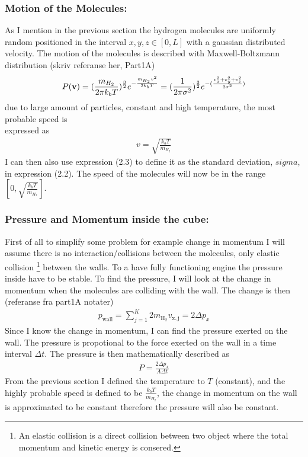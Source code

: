 \documentclass[a4paper,11pt,english]{report}
\begin{document}
\subsubsection{Motion of the Molecules:} As I mention in the previous section
the hydrogen molecules are uniformly random positioned in the interval
\(x,y,z \in [0,L]\) with a gaussian distributed velocity. The motion of the 
molecules is described with Maxwell-Boltzmann distribution (skriv referanse
her, Part1A)
\begin{align}
  P(\bold{v}) = (\frac{m_{H_{2}}}{2\pi
  k_{b}T})^{\frac{3}{2}}e^{-\frac{m_{H_{2}}v^{2}}{2k_{b}T}} =( \frac{1}{2\pi
  \sigma^{2}})^{\frac{3}{2}}e^{-(\frac{v_{x}^{2} + v_{y}^{2} + v_{z}^{2}}{2\sigma^{2}})}
\end{align}
due to large amount of particles, constant and high temperature, the most probable speed
is \\expressed as
\begin{align}
  v = \sqrt{\frac{k_{b}T}{m_{H_{2}}}}
\end{align}
I can then also use expression (2.3) to define it as the standard deviation,
\(sigma\), in expression (2.2). The speed of the molecules will now be in the
range \([0, \sqrt{\frac{k_{b}T}{m_{H_{2}}}} ]\).
\subsubsection{Pressure and Momentum inside the cube:} First of all to simplify some
problem for example change in momentum I will assume there is no
interaction/collisions between the molecules, only elastic collision
\footnote{An elastic collision is a direct collision between two object where
  the total momentum and kinetic energy is consered.} between the walls. To a
have fully functioning engine the pressure inside have to be stable. To find
the pressure, I will look at the
change in 
momentum when the molecules are colliding with the wall. The change is then (referanse fra part1A notater)
\begin{align}
 p_{\mathrm{wall}} =  \sum_{j = 1}^{K}2m_{\mathrm{H_{2}}}v_{\mathrm{x,j}} =
  2\Delta p_{x}
\end{align}
Since I know the change in momentum, I can find the pressure exerted on the
wall. The pressure is propotional to the force exerted on the wall in a time
interval \(\Delta t\). The pressure is then mathematically described as 
\begin{align}
  P =  \frac{2\Delta p_{x}}{A\Delta t}
\end{align}
From the previous section I defined the temperature to \(T\) (constant), and
the highly probable speed is defined to be \(\frac{k_{b}T}{m_{H_{2}}}\), the
change in
momentum on the wall is approximated to be constant therefore the pressure will also
be constant.
\newpage
\end{document}
